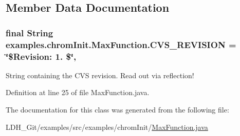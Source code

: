 \subsection{Member Data Documentation}
\hypertarget{classexamples_1_1chrom_init_1_1_max_function_a3516a5f98c1099c6dd4015eaa9e3b821}{
\subsubsection[{C\-V\-S\-\_\-\-R\-E\-V\-I\-S\-I\-O\-N}]{\setlength{\rightskip}{0pt plus 5cm}final String examples.\-chrom\-Init.\-Max\-Function.\-C\-V\-S\-\_\-\-R\-E\-V\-I\-S\-I\-O\-N = \char`\"{}\$Revision\-: 1. \$\char`\"{}\hspace{0.3cm}{\ttfamily [static]}, {\ttfamily [private]}}}\label{classexamples_1_1chrom_init_1_1_max_function_a3516a5f98c1099c6dd4015eaa9e3b821}
String containing the C\-V\-S revision. Read out via reflection! 

Definition at line 25 of file Max\-Function.\-java.



The documentation for this class was generated from the following file\-:\begin{DoxyCompactItemize}
\item 
L\-D\-H\-\_\-\-Git/examples/src/examples/chrom\-Init/\hyperlink{examples_2src_2examples_2chrom_init_2_max_function_8java}{Max\-Function.\-java}\end{DoxyCompactItemize}
